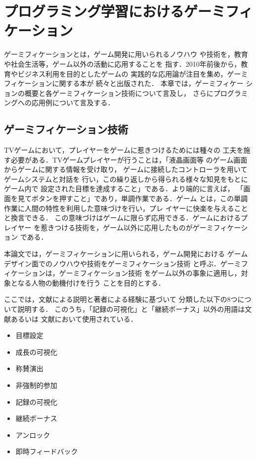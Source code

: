 \documentclass{jreport}
\begin{document}
\chapter{プログラミング学習におけるゲーミフィケーション}

ゲーミフィケーションとは，ゲーム開発に用いられるノウハウ
や技術を，教育や社会生活等，ゲーム以外の活動に応用することを
指す\cite{Inoue:Gamification}．2010年前後から，教育やビジネス利用を目的としたゲームの
実践的な応用論が注目を集め，ゲーミフィケーションに関する本が
続々と出版された\cite{TGS}．
本章では，ゲーミフィケー
ションの概要と各ゲーミフィケーション技術について言及し，
さらにプログラミングへの応用例について言及する．

\section{ゲーミフィケーション技術}
TVゲームにおいて，プレイヤーをゲームに惹きつけるためには種々の
工夫を施す必要がある．TVゲームプレイヤーが行うことは，「液晶画面等
のゲーム画面からゲームに関する情報を受け取り，
ゲームに接続したコントローラを用いてゲームシステムと対話を
行い，この繰り返しから得られる様々な知見をもとにゲーム内で
設定された目標を達成すること」である．より端的に言えば，
「画面を見てボタンを押すこと」であり，単調作業である．ゲーム
とは，この単調作業に人間の特性を利用した意味づけを行い，プレ
イヤーに快楽を与えることと換言できる．
この意味づけはゲームに限らず応用できる．ゲームにおけるプレイヤー
を惹きつける技術を，ゲーム以外に応用したものがゲーミフィケーション
である．

本論文では，ゲーミフィケーションに用いられる，ゲーム開発における
ゲームデザイン面でのノウハウや技術をゲーミフィケーション技術
と呼ぶ．ゲーミフィケーションは，ゲーミフィケーション技術
をゲーム以外の事象に適用し，対象となる人物の動機付けを行う
ことを目的とする．

ここでは，文献\cite{Kishimoto,Inoue:Gamification}による説明と著者による経験に基づいて
分類した以下の8つについて説明する．
このうち，「記録の可視化」と「継続ボーナス」以外の用語は文献\cite{Inoue:Gamification}あるいは
文献\cite{Kishimoto}において使用されている．

\begin{itemize}
  \item 目標設定
  \item 成長の可視化
  \item 称賛演出
  \item 非強制的参加
  \item 記録の可視化
  \item 継続ボーナス
  \item アンロック
  \item 即時フィードバック
\end{itemize}
\end{document}
